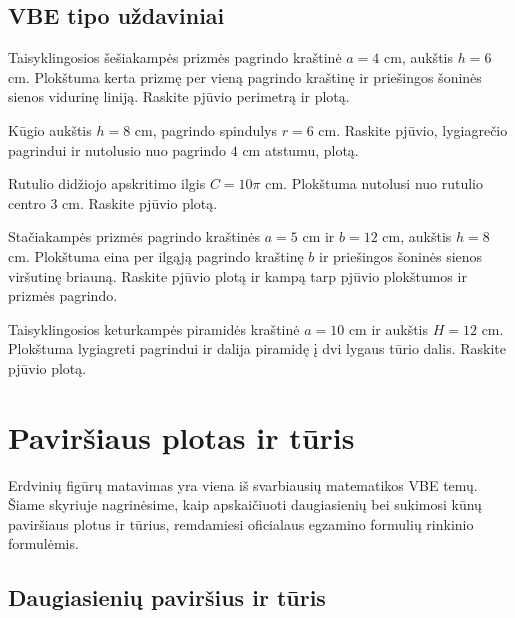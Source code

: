 \subsection{VBE tipo uždaviniai}

\begin{exercise}
Taisyklingosios šešiakampės prizmės pagrindo kraštinė $a = 4$ cm, aukštis $h = 6$ cm. Plokštuma kerta prizmę per vieną pagrindo kraštinę ir priešingos šoninės sienos vidurinę liniją. Raskite pjūvio perimetrą ir plotą.
\end{exercise}

\begin{exercise}
Kūgio aukštis $h = 8$ cm, pagrindo spindulys $r = 6$ cm. Raskite pjūvio, lygiagrečio pagrindui ir nutolusio nuo pagrindo $4$ cm atstumu, plotą.
\end{exercise}

\begin{exercise}
Rutulio didžiojo apskritimo ilgis $C = 10\pi$ cm. Plokštuma nutolusi nuo rutulio centro $3$ cm. Raskite pjūvio plotą.
\end{exercise}

\begin{exercise}
Stačiakampės prizmės pagrindo kraštinės $a = 5$ cm ir $b = 12$ cm, aukštis $h = 8$ cm. Plokštuma eina per ilgąją pagrindo kraštinę $b$ ir priešingos šoninės sienos viršutinę briauną. Raskite pjūvio plotą ir kampą tarp pjūvio plokštumos ir prizmės pagrindo.
\end{exercise}

\begin{exercise}
Taisyklingosios keturkampės piramidės kraštinė $a = 10$ cm ir aukštis $H = 12$ cm. Plokštuma lygiagreti pagrindui ir dalija piramidę į dvi lygaus tūrio dalis. Raskite pjūvio plotą.
\end{exercise}


\section{Paviršiaus plotas ir tūris}

Erdvinių figūrų matavimas yra viena iš svarbiausių matematikos VBE temų. Šiame skyriuje nagrinėsime, kaip apskaičiuoti daugiasienių bei sukimosi kūnų paviršiaus plotus ir tūrius, remdamiesi oficialaus egzamino formulių rinkinio formulėmis.

\subsection{Daugiasienių paviršius ir tūris}

